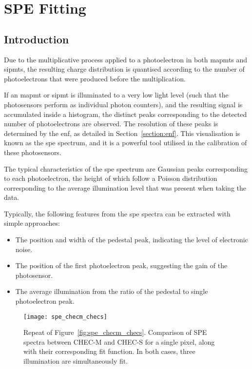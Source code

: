 \chapter{\label{a3-spe}SPE Fitting}

\minitoc

\section{Introduction}

Due to the multiplicative process applied to a photoelectron in both \glspl{mapmt} and \glspl{sipmt}, the resulting charge distribution is quantised according to the number of photoelectrons that were produced before the multiplication. 

If an \gls{mapmt} or \gls{sipmt} is illuminated to a very low light level (such that the photosensors perform as individual photon counters), and the resulting signal is accumulated inside a histogram, the distinct peaks corresponding to the detected number of photoelectrons are observed. The resolution of these peaks is determined by the \gls{enf}, as detailed in Section~\ref{section:enf}. This visualisation is known as the \gls{spe} spectrum, and it is a powerful tool utilised in the calibration of these photosensors.

The typical characteristics of the \gls{spe} spectrum are Gaussian peaks corresponding to each photoelectron, the height of which follow a Poisson distribution corresponding to the average illumination level that was present when taking the data.

Typically, the following features from the \gls{spe} spectra can be extracted with simple approaches:
\begin{itemize}
\item The position and width of the pedestal peak, indicating the level of electronic noise.
\item The position of the first photoelectron peak, suggesting the gain of the photosensor.
\item The average illumination from the ratio of the pedestal to single photoelectron peak.
\end{itemize}

\begin{figure}
	\centering
    \texttt{[image: spe\_checm\_checs]} 
	\caption[(Repeated) Comparison of SPE spectra between CHEC-M and CHEC-S.]{Repeat of Figure~\ref{fig:spe_checm_checs}. Comparison of SPE spectra between CHEC-M and CHEC-S for a single pixel, along with their corresponding fit function. In both cases, three illumination are simultaneously fit.} 
	\label{fig:spe_checm_checs_repeat}
\end{figure}

